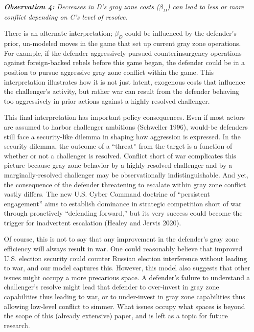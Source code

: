 \documentclass[
]{article}
\begin{document}
\textbf{\textit{Observation 4:}}\textit{ Decreases in D's gray zone costs ($\beta_{D}$) can lead to less or more conflict depending on C's level of resolve.}

There is an alternate interpretation; \(\beta_{D}\) could be influenced by the defender's prior, un-modeled moves in the game that set up current gray zone operations. For example, if the defender aggressively pursued counterinsurgency operations against foreign-backed rebels before this game began, the defender could be in a position to pursue aggressive gray zone conflict within the game. This interpretation illustrates how it is not just latent, exogenous costs that influence the challenger's activity, but rather war can result from the defender behaving too aggressively in prior actions against a highly resolved challenger.

This final interpretation has important policy consequences. Even if most actors are assumed to harbor challenger ambitions (Schweller 1996), would-be defenders still face a security-like dilemma in shaping how aggression is expressed. In the security dilemma, the outcome of a ``threat'' from the target is a function of whether or not a challenger is resolved. Conflict short of war complicates this picture because gray zone behavior by a highly resolved challenger and by a marginally-resolved challenger may be observationally indistinguishable. And yet, the consequence of the defender threatening to escalate within gray zone conflict vastly differs. The new U.S. Cyber Command doctrine of ``persistent engagement'' aims to establish dominance in strategic competition short of war through proactively ``defending forward,'' but its very success could become the trigger for inadvertent escalation (Healey and Jervis 2020).

Of course, this is not to say that any improvement in the defender's gray zone efficiency will always result in war. One could reasonably believe that improved U.S. election security could counter Russian election interference without leading to war, and our model captures this. However, this model also suggests that other issues might occupy a more precarious space. A defender's failure to understand a challenger's resolve might lead that defender to over-invest in gray zone capabilities thus leading to war, or to under-invest in gray zone capabilities thus allowing low-level conflict to simmer. What issues occupy what spaces is beyond the scope of this (already extensive) paper, and is left as a topic for future research.
\end{document}
